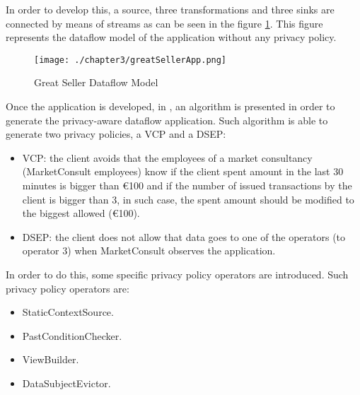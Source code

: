 In order to develop this, a source, three transformations and three sinks are connected by means of streams as can be seen in the figure \ref{fig:Great Seller Dataflow Model}. This figure represents the dataflow model of the application without any privacy policy.

\begin{figure}
\centering
{\texttt{[image: ./chapter3/greatSellerApp.png]}}
\caption{Great Seller Dataflow Model}
\label{fig:Great Seller Dataflow Model}
\end{figure}

Once the application is developed, in \cite{privacypoliciesarticle}, an algorithm is presented in order to generate the privacy-aware dataflow application. Such algorithm is able to generate two privacy policies, a VCP and a DSEP:

\begin{itemize}
\item VCP: the client avoids that the employees of a market consultancy (MarketConsult employees) know if the client spent amount in the last 30 minutes is bigger than \euro{100} and if the number of issued transactions by the client is bigger than 3, in such case, the spent amount should be modified to the biggest allowed (\euro{100}).
\item DSEP: the client does not allow that data goes to one of the operators (to operator 3) when MarketConsult observes the application.
\end{itemize}

In order to do this, some specific privacy policy operators are introduced. Such privacy policy operators are:

\begin{itemize}
\item StaticContextSource.
\item PastConditionChecker.
\item ViewBuilder.
\item DataSubjectEvictor.
\end{itemize}

